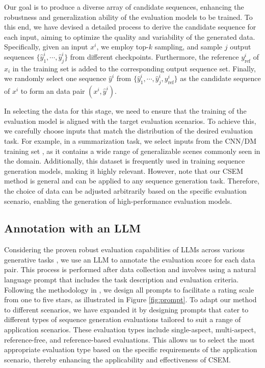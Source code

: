\documentclass[lettersize,journal]{IEEEtran}
\begin{document}
Our goal is to produce a diverse array of candidate sequences, enhancing the robustness and generalization ability of the evaluation models to be trained. To this end, we have devised a detailed process to derive the candidate sequence for each input, aiming to optimize the quality and variability of the generated data. Specifically, given an input $x^{i}$, we employ top-$k$ sampling, and sample $j$ output sequences $\{\hat{y}_1^i, \cdots, \hat{y}_j^i\}$ from different checkpoints. Furthermore, the reference $y^{i}_{\mathrm{ref}}$ of $x_{i}$ in the training set is added to the corresponding output sequence set. Finally, we randomly select one sequence $\hat{y}^i$ from $\{\hat{y}_1^i, \cdots, \hat{y}_j^i, y^{i}_{\mathrm{ref}}\}$ as the candidate sequence of $x^{i}$ to form an data pair $(x^{i}, \hat{y}^i)$.

In selecting the data for this stage, we need to ensure that the training of the evaluation model is aligned with the target evaluation scenarios. To achieve this, we carefully choose inputs that match the distribution of the desired evaluation task. For example, in a summarization task, we select inputs from the CNN/DM training set \cite{hermann2015teaching}, as it contains a wide range of generalizable scenes commonly seen in the domain. Additionally, this dataset is frequently used in training sequence generation models, making it highly relevant. However, note that our CSEM method is general and can be applied to any sequence generation task. Therefore, the choice of data can be adjusted arbitrarily based on the specific evaluation scenario, enabling the generation of high-performance evaluation models.

\subsection{Annotation with an LLM}
\label{sec:annotation}
Considering the proven robust evaluation capabilities of LLMs across various generative tasks \cite{fu2023gptscore, kocmi2023large, mohtashami2023learning, wang2023chatgpt, lai2023multidimensional}, we use an LLM to annotate the evaluation score for each data pair. This process is performed after data collection and involves using a natural language prompt that includes the task description and evaluation criteria. Following the methodology in \cite{wang2023chatgpt}, we design all prompts to facilitate a rating scale from one to five stars, as illustrated in Figure \ref{fig:prompt}. To adapt our method to different scenarios, we have expanded it by designing prompts that cater to different types of sequence generation evaluations tailored to suit a range of application scenarios. These evaluation types include single-aspect, multi-aspect, reference-free, and reference-based evaluations. This allows us to select the most appropriate evaluation type based on the specific requirements of the application scenario, thereby enhancing the applicability and effectiveness of CSEM.
\end{document}
